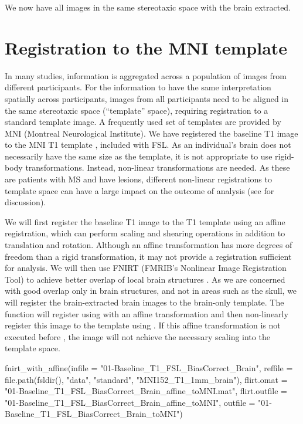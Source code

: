 We now have all images in the same stereotaxic space with the brain extracted.  

\section{Registration to the MNI template}
In many studies, information is aggregated across a population of images from different participants.  For the information to have the same interpretation spatially across participants, images from all participants need to be aligned in the same stereotaxic space (``template'' space), requiring registration to a standard template image.  A frequently used set of templates are provided by MNI (Montreal Neurological Institute). We have registered the baseline T1 image to the MNI T1 template \citep{hutchison_symmetric_2006}, included with FSL.  As an individual's brain does not necessarily have the same size as the template, it is not appropriate to use rigid-body transformations.  Instead, non-linear transformations are needed.  As these are patients with MS and have lesions, different non-linear registrations to template space can have a large impact on the outcome of analysis (see \citet{eloyan_health_2014} for discussion).


We will first register the baseline T1 image to the T1 template using an affine registration, which can perform scaling and shearing operations in addition to translation and rotation.  Although an affine transformation has more degrees of freedom than a rigid transformation, it may not provide a registration sufficient for analysis.  We will then use FNIRT (FMRIB's Nonlinear Image Registration Tool) to achieve better overlap of local brain structures \citep{jenkinson_fsl_2012, andersson_non-linear_2007}.  As we are concerned with good overlap only in brain structures, and not in areas such as the skull, we will register the brain-extracted brain images to the brain-only template.  The  function  will register using  with an affine transformation and then non-linearly register this image to the template using .  If this affine transformation is not executed before , the image will not achieve the necessary scaling into the template space.


\gobblepars
\begin{Schunk}
\begin{Sinput}
fnirt_with_affine(infile = "01-Baseline_T1_FSL_BiasCorrect_Brain",
                  reffile = file.path(fsldir(), "data", 
                  "standard", "MNI152_T1_1mm_brain"),                     
                  flirt.omat = 
                  	"01-Baseline_T1_FSL_BiasCorrect_Brain_affine_toMNI.mat", 
                  flirt.outfile = 
                  	"01-Baseline_T1_FSL_BiasCorrect_Brain_affine_toMNI", 
                  outfile = "01-Baseline_T1_FSL_BiasCorrect_Brain_toMNI")
\end{Sinput}
\end{Schunk}
\gobblepars

